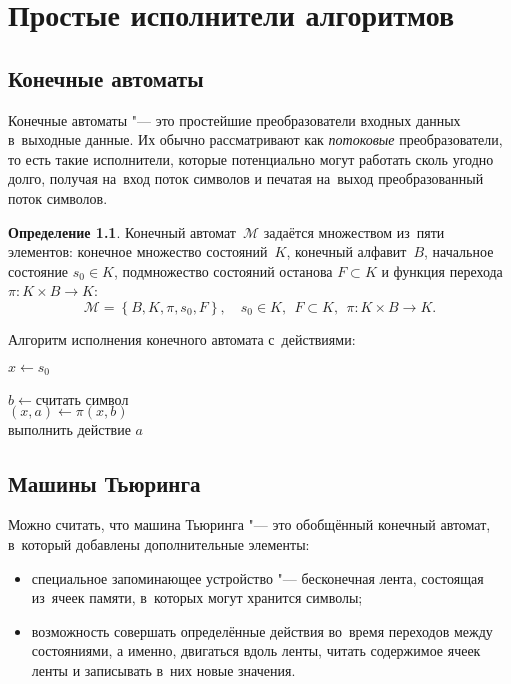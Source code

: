 
\chapter{Простые исполнители алгоритмов}

\section{Конечные автоматы}
Конечные автоматы "--- это простейшие преобразователи входных данных в~выходные данные. Их обычно рассматривают как \emph{потоковые} преобразователи, то есть такие исполнители, которые потенциально могут работать сколь угодно долго, получая на~вход поток символов и печатая на~выход преобразованный поток символов.

\theoremstyle{definition}
\newtheorem{definition}{Определение}

\begin{definition}
  Конечный автомат~\(\mathcal M\) задаётся множеством из~пяти элементов: конечное множество состояний~\(K\), конечный алфавит~\(B\), начальное состояние \(s_0\in K\), подмножество состояний останова \(F\subset K\) и функция перехода \(\pi\colon K\times B \rightarrow K\):
  \[
    \mathcal M = \left\{ B, K, \pi, s_0, F \right\},\quad s_0\in K,~~F\subset K,~~\pi\colon K\times B \rightarrow K.
  \]
\end{definition}

Алгоритм исполнения конечного автомата с~действиями:
\begin{tabbing}
  \(x \leftarrow s_0\) \\
   \\
  \quad\= \(b\leftarrow \text{считать символ}\) \\
  \> \(\left(x, a\right)\leftarrow \pi\left(x, b\right)\) \\
  \> выполнить действие \(a\) \\
\end{tabbing}



\section{Машины Тьюринга}
Можно считать, что машина Тьюринга "--- это обобщённый конечный автомат, в~который добавлены дополнительные элементы:
\begin{itemize}
  \item специальное запоминающее устройство "--- бесконечная лента, состоящая из~ячеек памяти, в~которых могут хранится символы;
  \item возможность совершать определённые действия во~время переходов между состояниями, а именно, двигаться вдоль ленты, читать содержимое ячеек ленты и записывать в~них новые значения.
\end{itemize}

